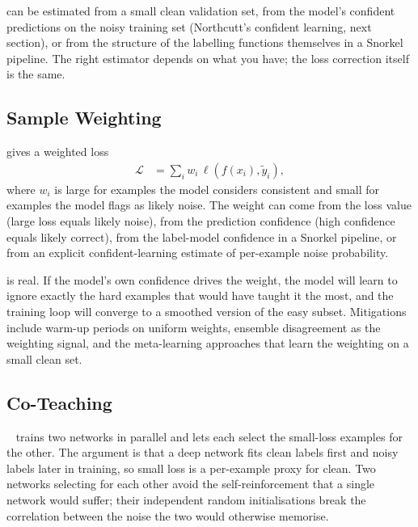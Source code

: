  can be estimated from a small clean validation set, from the model's confident predictions on the noisy training set (Northcutt's confident learning, next section), or from the structure of the labelling functions themselves in a Snorkel pipeline. The right estimator depends on what you have; the loss correction itself is the same.

\subsection{Sample Weighting}

 gives a weighted loss
\begin{align*}
    \mathcal{L} &= \sum_i w_i \, \ell(f(x_i), \tilde y_i),
\end{align*}
where $w_i$ is large for examples the model considers consistent and small for examples the model flags as likely noise. The weight can come from the loss value (large loss equals likely noise), from the prediction confidence (high confidence equals likely correct), from the label-model confidence in a Snorkel pipeline, or from an explicit confident-learning estimate of per-example noise probability.

 is real. If the model's own confidence drives the weight, the model will learn to ignore exactly the hard examples that would have taught it the most, and the training loop will converge to a smoothed version of the easy subset. Mitigations include warm-up periods on uniform weights, ensemble disagreement as the weighting signal, and the meta-learning approaches that learn the weighting on a small clean set.

\subsection{Co-Teaching}

~\cite{Han2018CoTeaching} trains two networks in parallel and lets each select the small-loss examples for the other. The argument is that a deep network fits clean labels first and noisy labels later in training, so small loss is a per-example proxy for clean. Two networks selecting for each other avoid the self-reinforcement that a single network would suffer; their independent random initialisations break the correlation between the noise the two would otherwise memorise.

